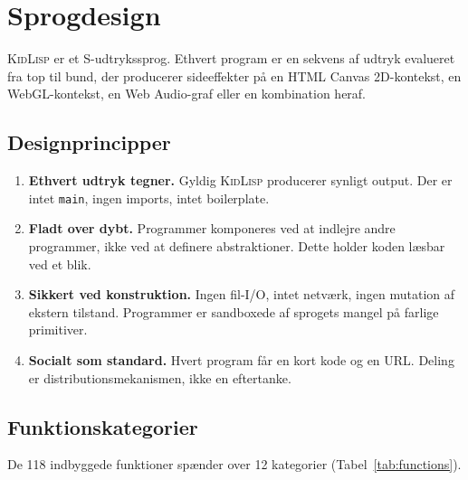 \documentclass[10pt,letterpaper,twocolumn]{article}
\newcommand{\kidlisp}{\textsc{KidLisp}}
\begin{document}

\section{Sprogdesign}
\label{sec:design}

\kidlisp{} er et S-udtrykssprog. Ethvert program er en sekvens af udtryk evalueret fra top til bund, der producerer sideeffekter på en HTML Canvas 2D-kontekst, en WebGL-kontekst, en Web Audio-graf eller en kombination heraf.

\subsection{Designprincipper}

\begin{enumerate}
  \item \textbf{Ethvert udtryk tegner.} Gyldig \kidlisp{} producerer synligt output. Der er intet \texttt{main}, ingen imports, intet boilerplate.
  \item \textbf{Fladt over dybt.} Programmer komponeres ved at indlejre andre programmer, ikke ved at definere abstraktioner. Dette holder koden læsbar ved et blik.
  \item \textbf{Sikkert ved konstruktion.} Ingen fil-I/O, intet netværk, ingen mutation af ekstern tilstand. Programmer er sandboxede af sprogets mangel på farlige primitiver.
  \item \textbf{Socialt som standard.} Hvert program får en kort kode og en URL. Deling er distributionsmekanismen, ikke en eftertanke.
\end{enumerate}

\subsection{Funktionskategorier}

De 118 indbyggede funktioner spænder over 12 kategorier (Tabel~\ref{tab:functions}).
\end{document}
